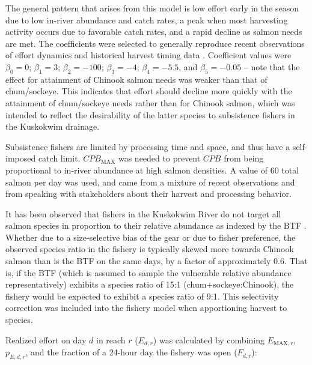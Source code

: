 \documentclass[12pt,]{book}
\theoremstyle{definition}
\theoremstyle{definition}
\theoremstyle{definition}
\theoremstyle{remark}
\begin{document}
The general pattern that arises from this model is low effort early in
the season due to low in-river abundance and catch rates, a peak when
most harvesting activity occurs due to favorable catch rates, and a
rapid decline as salmon needs are met. The coefficients were selected to
generally reproduce recent observations of effort dynamics
\citep{staton-coggins-2016, staton-coggins-2017, staton-2018} and
historical harvest timing data \citep[ and see Appendix \ref{appendix-b}
for a validation]{hamazaki-2008, hamazaki-2011}. Coefficient values were
\(\beta_0 = 0\); \(\beta_1 = 3\); \(\beta_2 = -100\); \(\beta_3 = -4\);
\(\beta_4 = -5.5\), and \(\beta_5 = -0.05\) -- note that the effect for
attainment of Chinook salmon needs was weaker than that of chum/sockeye.
This indicates that effort should decline more quickly with the
attainment of chum/sockeye needs rather than for Chinook salmon, which
was intended to reflect the desirability of the latter species to
subsistence fishers in the Kuskokwim drainage.

Subsistence fishers are limited by processing time and space, and thus
have a self-imposed catch limit. \(CPB_{\text{MAX}}\) was needed to
prevent \(CPB\) from being proportional to in-river abundance at high
salmon densities. A value of 60 total salmon per day was used, and came
from a mixture of recent observations
\citep{staton-coggins-2016, staton-coggins-2017, staton-2018} and from
speaking with stakeholders about their harvest and processing behavior.

It has been observed that fishers in the Kuskokwim River do not target
all salmon species in proportion to their relative abundance as indexed
by the BTF
\citep{staton-coggins-2016, staton-coggins-2017, staton-2018}. Whether
due to a size-selective bias of the gear or due to fisher preference,
the observed species ratio in the fishery is typically skewed more
towards Chinook salmon than is the BTF on the same days, by a factor of
approximately 0.6. That is, if the BTF (which is assumed to sample the
vulnerable relative abundance representatively) exhibits a species ratio
of 15:1 (chum+sockeye:Chinook), the fishery would be expected to exhibit
a species ratio of 9:1. This selectivity correction was included into
the fishery model when apportioning harvest to species.

Realized effort on day \(d\) in reach \(r\) (\(E_{d,r}\)) was calculated
by combining \(E_{\text{MAX},r}\), \(p_{E,d,r}\), and the fraction of a
24-hour day the fishery was open (\(F_{d,r}\)):
\end{document}
